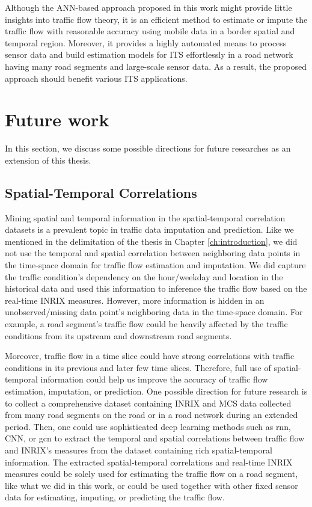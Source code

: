 \documentclass[english]{kththesis}
\begin{document}
Although the ANN-based approach proposed in this work might provide little insights into traffic flow theory, it is an efficient method to estimate or impute the traffic flow with reasonable accuracy using mobile data in a border spatial and temporal region. Moreover, it provides a highly automated means to process sensor data and build estimation models for ITS effortlessly in a road network having many road segments and large-scale sensor data. As a result, the proposed approach should benefit various ITS applications.


\section{Future work}
\label{sec:futureWork}

In this section, we discuss some possible directions for future researches as an extension of this thesis.

\subsection{Spatial-Temporal Correlations}
Mining spatial and temporal information in the spatial-temporal correlation datasets is a prevalent topic in traffic data imputation and prediction. Like we mentioned in the delimitation of the thesis in Chapter \ref{ch:introduction}, we did not use the temporal and spatial correlation between neighboring data points in the time-space domain for traffic flow estimation and imputation. We did capture the traffic condition's dependency on the hour/weekday and location in the historical data and used this information to inference the traffic flow based on the real-time INRIX measures. However, more information is hidden in an unobserved/missing data point's neighboring data in the time-space domain. For example, a road segment's traffic flow could be heavily affected by the traffic conditions from its upstream and downstream road segments.

Moreover, traffic flow in a time slice could have strong correlations with traffic conditions in its previous and later few time slices. Therefore, full use of spatial-temporal information could help us improve the accuracy of traffic flow estimation, imputation, or prediction. One possible direction for future research is to collect a comprehensive dataset containing INRIX and MCS data collected from many road segments on the road or in a road network during an extended period. Then, one could use sophisticated deep learning methods such as \gls{rnn}, CNN, or \gls{gcn} to extract the temporal and spatial correlations between traffic flow and INRIX's measures from the dataset containing rich spatial-temporal information. The extracted spatial-temporal correlations and real-time INRIX measures could be solely used for estimating the traffic flow on a road segment, like what we did in this work, or could be used together with other fixed sensor data for estimating, imputing, or predicting the traffic flow.
\end{document}
